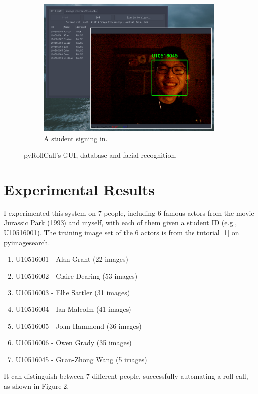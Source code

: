 \documentclass[14pt]{report}
\begin{document}
\begin{figure}[b!]
\begin{subfigure}[b]{0.32\linewidth}
    \includegraphics[width=\linewidth]{figures/preview3.eps}
    \caption{A student signing in.}
  \end{subfigure}
  \caption{pyRollCall's GUI, database and facial recognition.}
  \label{fig:implementation}
\end{figure}


\section{Experimental Results}
I experimented this system on 7 people, including 6 famous actors from the movie Jurassic Park (1993) and
myself, with each of them given a student ID (e.g., U10516001). The training image set of the 6 actors is
from the tutorial [1] on pyimagesearch.
\newline

\begin{enumerate}
  \item U10516001 - Alan Grant (22 images)
  \item U10516002 - Claire Dearing (53 images)
  \item U10516003 - Ellie Sattler (31 images)
  \item U10516004 - Ian Malcolm (41 images)
  \item U10516005 - John Hammond (36 images)
  \item U10516006 - Owen Grady (35 images)
  \item U10516045 - Guan-Zhong Wang (5 images)
\end{enumerate}

It can distinguish between 7 different people, successfully automating a roll call, as shown in Figure 2.
\end{document}
